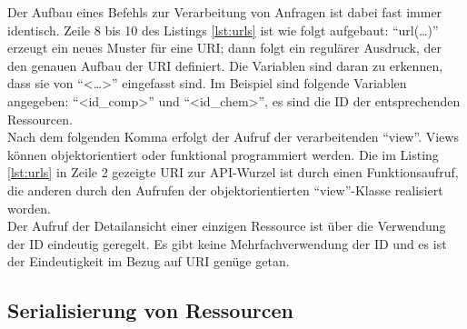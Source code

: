 Der Aufbau eines Befehls zur Verarbeitung von Anfragen ist dabei fast immer
identisch. Zeile 8 bis 10 des Listings \ref{lst:urls} ist wie folgt aufgebaut:
"`url(\ldots)"' erzeugt ein neues Muster für eine \ac{URI}; dann folgt ein
regulärer Ausdruck, der den genauen Aufbau der \ac{URI} definiert. Die
Variablen sind daran zu erkennen, dass sie von "`<\ldots>"' eingefasst
sind. Im Beispiel sind folgende Variablen angegeben:
"`<id\_comp>"' und "`<id\_chem>"', es sind die ID der entsprechenden
Ressourcen.
\\
Nach dem folgenden Komma erfolgt der Aufruf der verarbeitenden "`view"'. Views
können objektorientiert oder funktional programmiert werden. Die im Listing
\ref{lst:urls} in Zeile 2 gezeigte \ac{URI} zur \ac{API}-Wurzel ist durch
einen Funktionsaufruf, die anderen durch den Aufrufen der
objektorientierten "`view"'-Klasse realisiert worden.
\\
Der Aufruf der Detailansicht einer einzigen Ressource ist über die Verwendung
der ID eindeutig geregelt. Es gibt keine Mehrfachverwendung der ID und
es ist der Eindeutigkeit im Bezug auf \ac{URI} genüge getan.

\subsection{Serialisierung von Ressourcen}
\label{sec:serialisierung}

